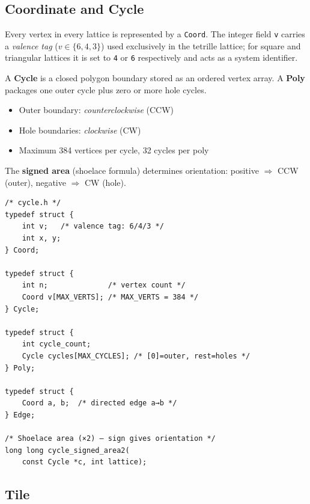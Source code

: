\documentclass[10pt,a4paper]{article}
\newcommand{\code}[1]{\texttt{\small #1}}
\newcommand{\file}[1]{\texttt{\footnotesize #1}}
\begin{document}
\subsection{Coordinate and Cycle}

\begin{tcolorbox}[dualbox, title={Coordinate, Cycle, Poly, Edge --- \file{src/core/cycle.h}}]
  Every vertex in every lattice is represented by a \code{Coord}.
  The integer field \code{v} carries a \emph{valence tag}
  ($v \in \{6, 4, 3\}$) used exclusively in the tetrille lattice;
  for square and triangular lattices it is set to \code{4} or
  \code{6} respectively and acts as a system identifier.

  A \textbf{Cycle} is a closed polygon boundary stored as an ordered
  vertex array.  A \textbf{Poly} packages one outer cycle plus zero or
  more hole cycles.

  \begin{itemize}
    \item Outer boundary: \emph{counterclockwise} (CCW)
    \item Hole boundaries: \emph{clockwise} (CW)
    \item Maximum 384 vertices per cycle, 32 cycles per poly
  \end{itemize}

  The \textbf{signed area} (shoelace formula) determines orientation:
  positive $\Rightarrow$ CCW (outer), negative $\Rightarrow$ CW (hole).
\tcblower
\begin{verbatim}
/* cycle.h */
typedef struct {
    int v;   /* valence tag: 6/4/3 */
    int x, y;
} Coord;

typedef struct {
    int n;              /* vertex count */
    Coord v[MAX_VERTS]; /* MAX_VERTS = 384 */
} Cycle;

typedef struct {
    int cycle_count;
    Cycle cycles[MAX_CYCLES]; /* [0]=outer, rest=holes */
} Poly;

typedef struct {
    Coord a, b;  /* directed edge a→b */
} Edge;

/* Shoelace area (×2) — sign gives orientation */
long long cycle_signed_area2(
    const Cycle *c, int lattice);
\end{verbatim}
\end{tcolorbox}

\subsection{Tile}
\end{document}
